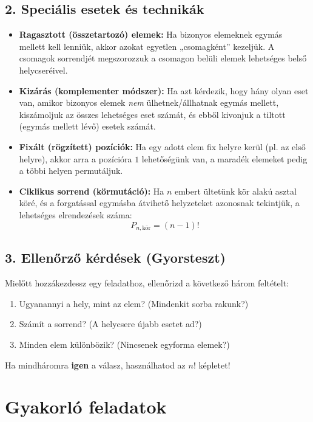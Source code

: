 \documentclass[12pt,a4paper]{article}
\begin{document}
\subsection*{2. Speciális esetek és technikák}
\begin{itemize}
    \item \textbf{Ragasztott (összetartozó) elemek:} Ha bizonyos elemeknek egymás mellett kell lenniük, akkor azokat egyetlen „csomagként” kezeljük. A csomagok sorrendjét megszorozzuk a csomagon belüli elemek lehetséges belső helycseréivel.
    \item \textbf{Kizárás (komplementer módszer):} Ha azt kérdezik, hogy hány olyan eset van, amikor bizonyos elemek \emph{nem} ülhetnek/állhatnak egymás mellett, kiszámoljuk az összes lehetséges eset számát, és ebből kivonjuk a tiltott (egymás mellett lévő) esetek számát.
    \item \textbf{Fixált (rögzített) pozíciók:} Ha egy adott elem fix helyre kerül (pl. az első helyre), akkor arra a pozícióra $1$ lehetőségünk van, a maradék elemeket pedig a többi helyen permutáljuk.
    \item \textbf{Ciklikus sorrend (körmutáció):} Ha $n$ embert ültetünk kör alakú asztal köré, és a forgatással egymásba átvihető helyzeteket azonosnak tekintjük, a lehetséges elrendezések száma:
    \begin{equation}
        P_{n,\text{kör}} = (n - 1)!
    \end{equation}
\end{itemize}

\subsection*{3. Ellenőrző kérdések (Gyorsteszt)}
Mielőtt hozzákezdessz egy feladathoz, ellenőrizd a következő három feltételt:
\begin{enumerate}
    \item Ugyanannyi a hely, mint az elem? (Mindenkit sorba rakunk?)
    \item Számít a sorrend? (A helycsere újabb esetet ad?)
    \item Minden elem különbözik? (Nincsenek egyforma elemek?)
\end{enumerate}
Ha mindháromra \textbf{igen} a válasz, használhatod az $n!$ képletet!

\newpage

\section*{Gyakorló feladatok}
\end{document}
